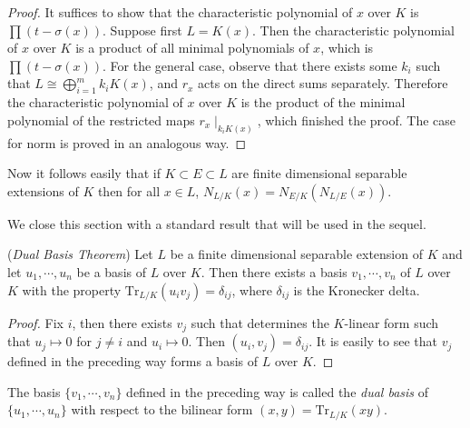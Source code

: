 \begin{proof}
It suffices to show that the characteristic polynomial of $x$ over $K$ is $\prod(t-\sigma(x))$. Suppose first $L=K(x)$. Then the characteristic polynomial of $x$ over $K$ is a product of all minimal polynomials of $x$, which is $\prod(t-\sigma(x))$. For the general case, observe that there exists some $k_i$ such that $L\cong\bigoplus_{i=1}^mk_iK(x)$, and $r_x$ acts on the direct sums separately. Therefore the characteristic polynomial of $x$ over $K$ is the product of the minimal polynomial of the restricted maps $r_x\mid_{k_iK(x)}$, which finished the proof. The case for norm is proved in an analogous way.
\end{proof}
Now it follows easily that if $K\subset E\subset L$ are finite dimensional separable extensions of $K$ then for all $x\in L$, $N_{L/K}(x)=N_{E/K}(N_{L/E}(x))$.\par
We close this section with a standard result that will be used in the sequel.
\begin{theorem}{(\textit{Dual Basis Theorem})}\label{dualbasis}
Let $L$ be a finite dimensional separable extension of $K$ and let $u_1,\cdots,u_n$ be a basis of $L$ over $K$. Then there exists a basis $v_1,\cdots,v_n$ of $L$ over $K$ with the property $\mathrm{Tr}_{L/K}(u_iv_j)=\delta_{ij}$, where $\delta_{ij}$ is the Kronecker delta.
\end{theorem}
\begin{proof}
Fix $i$, then there exists $v_j$ such that determines the $K$-linear form such that $u_j\mapsto 0$ for $j\ne i$ and $u_i\mapsto 0$. Then $(u_i,v_j)=\delta_{ij}$. It is easily to see that $v_j$ defined in the preceding way forms a basis of $L$ over $K$.
\end{proof}
The basis $\{v_1,\cdots,v_n\}$ defined in the preceding way is called the \textit{dual basis} of $\{u_1,\cdots,u_n\}$ with respect to the bilinear form $(x,y)=\mathrm{Tr}_{L/K}(xy)$.
